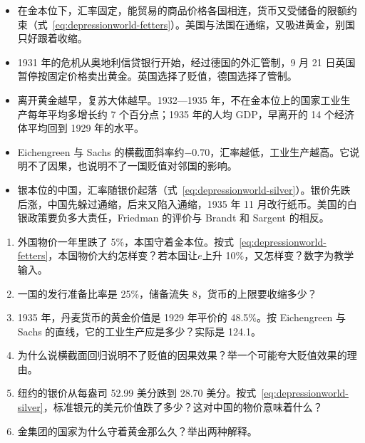 \begin{takeaways}
\begin{itemize}
\item 在金本位下，汇率固定，能贸易的商品价格各国相连，货币又受储备的限额约束（式~\eqref{eq:depressionworld-fetters}）。美国与法国在通缩，又吸进黄金，别国只好跟着收缩。
\item 1931 年的危机从奥地利信贷银行开始，经过德国的外汇管制，9 月 21 日英国暂停按固定价格卖出黄金。英国选择了贬值，德国选择了管制。
\item 离开黄金越早，复苏大体越早。1932—1935 年，不在金本位上的国家工业生产每年平均多增长约 7 个百分点；1935 年的人均 GDP，早离开的 14 个经济体平均回到 1929 年的水平。
\item Eichengreen 与 Sachs 的横截面斜率约$-0.70$，汇率越低，工业生产越高。它说明不了因果，也说明不了一国贬值对邻国的影响。
\item 银本位的中国，汇率随银价起落（式~\eqref{eq:depressionworld-silver}）。银价先跌后涨，中国先躲过通缩，后来又陷入通缩，1935 年 11 月改行纸币。美国的白银政策要负多大责任，Friedman 的评价与 Brandt 和 Sargent 的相反。
\end{itemize}
\end{takeaways}

\begin{selfcheck}
\begin{enumerate}
\item 外国物价一年里跌了 5\%，本国守着金本位。按式~\eqref{eq:depressionworld-fetters}，本国物价大约怎样变？若本国让$e$上升 10\%，又怎样变？数字为教学输入。
\item 一国的发行准备比率是 25\%，储备流失 8，货币的上限要收缩多少？
\item 1935 年，丹麦货币的黄金价值是 1929 年平价的 48.5\%。按 Eichengreen 与 Sachs 的直线，它的工业生产应是多少？实际是 124.1。
\item 为什么说横截面回归说明不了贬值的因果效果？举一个可能夸大贬值效果的理由。
\item 纽约的银价从每盎司 52.99 美分跌到 28.70 美分。按式~\eqref{eq:depressionworld-silver}，标准银元的美元价值跌了多少？这对中国的物价意味着什么？
\item 金集团的国家为什么守着黄金那么久？举出两种解释。
\end{enumerate}
\end{selfcheck}

